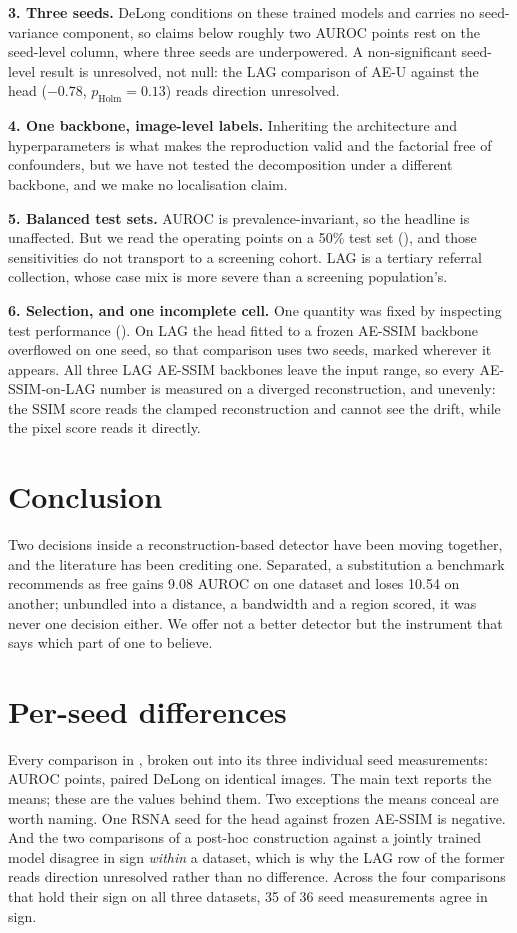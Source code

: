 \documentclass[pmlr,twocolumn,10pt]{jmlr} %
\begin{document}
\textbf{3. Three seeds.} DeLong conditions on these trained models and carries no
seed-variance component, so claims below roughly two AUROC points rest on the seed-level
column, where three seeds are underpowered. A non-significant seed-level result is
unresolved, not null: the LAG comparison of AE-U against the head ($-0.78$,
$p_{\mathrm{Holm}}=0.13$) reads direction unresolved.

\textbf{4. One backbone, image-level labels.} Inheriting the architecture and
hyperparameters is what makes the reproduction valid and the factorial free of confounders,
but we have not tested the decomposition under a different backbone, and we make no
localisation claim.

\textbf{5. Balanced test sets.} AUROC is prevalence-invariant, so the headline is
unaffected. But we read the operating points on a 50\% test set
(), and those sensitivities do not transport to a screening cohort.
LAG is a tertiary referral collection, whose case mix is more severe than a screening
population's.

\textbf{6. Selection, and one incomplete cell.} One quantity was fixed by inspecting test
performance (). On LAG the head fitted to a frozen AE-SSIM backbone
overflowed on one seed, so that comparison uses two seeds, marked wherever it appears. All
three LAG AE-SSIM backbones leave the input range, so every AE-SSIM-on-LAG number is measured
on a diverged reconstruction, and unevenly: the SSIM score reads the clamped reconstruction
and cannot see the drift, while the pixel score reads it directly.

\section{Conclusion}
Two decisions inside a reconstruction-based detector have been moving together, and the
literature has been crediting one. Separated, a substitution a benchmark recommends as free
gains 9.08 AUROC on one dataset and loses 10.54 on another; unbundled into a distance, a
bandwidth and a region scored, it was never one decision either. We offer not a better
detector but the instrument that says which part of one to believe.

\appendix

\section{Per-seed differences}
\label{apd:perseed}
Every comparison in , broken out into its three individual seed
measurements: AUROC points, paired DeLong on identical images. The main text reports the
means; these are the values behind them. Two exceptions the means conceal are worth
naming. One RSNA seed for the head against frozen AE-SSIM is negative. And the two
comparisons of a post-hoc construction against a jointly trained model disagree in sign
\emph{within} a dataset, which is why the LAG row of the former reads direction unresolved
rather than no difference. Across the four comparisons that hold their sign on all three
datasets, 35 of 36 seed measurements agree in sign.
\end{document}
